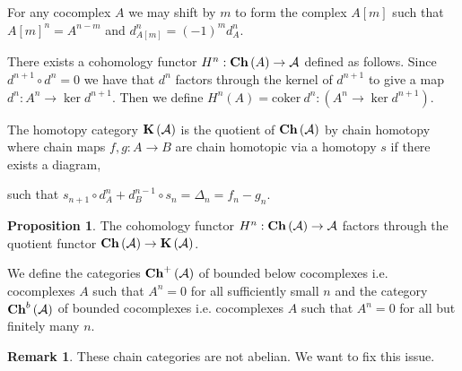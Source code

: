 \documentclass[12pt]{extarticle}
\newcommand{\coker}[1]{\mathrm{coker}\: #1}
\theoremstyle{definition}
\newtheorem{proposition}[theorem]{Proposition}
\newtheorem{remark}{Remark}
\newenvironment{definition}[1][Definition:]{\begin{trivlist}
\item[\hskip \labelsep {\bfseries #1}]}{\end{trivlist}}
\begin{document}
\begin{definition}
For any cocomplex $A$ we may shift by $m$ to form the complex $A[m]$ such that $A[m]^n = A^{n - m}$ and $d_{A[m]}^n = (-1)^m d_A^n$. 
\end{definition}

\begin{definition}
There exists a cohomology functor $H^n : \mathbf{Ch}\left( A \right) \to \mathcal{A}$ defined as follows. Since $d^{n+1} \circ d^n = 0$ we have that $d^{n}$ factors through the kernel of $d^{n+1}$ to give a map $d^{n} : A^n \to \ker{d^{n+1}}$. Then we define $H^n(A) = \coker{d^n : (A^n \to \ker{d^{n+1}})}$. 
\end{definition}

\begin{definition}
The homotopy category $\mathbf{K}\left( \mathcal{A} \right)$ is the quotient of $\mathbf{Ch}\left( \mathcal{A} \right)$ by chain homotopy where chain maps $f, g : A \to B$ are chain homotopic via a homotopy $s$ if there exists a diagram,
\begin{center}
\end{center}
such that $s_{n+1} \circ d_A^n + d_B^{n-1} \circ s_n = \Delta_n = f_n - g_n$.
\end{definition}

\begin{proposition}
The cohomology functor $H^n : \mathbf{Ch}\left( \mathcal{A} \right) \to \mathcal{A}$ factors through the quotient functor $\mathbf{Ch}\left( \mathcal{A} \right) \to \mathbf{K}\left( \mathcal{A} \right)$. 
\end{proposition}

\begin{definition}
We define the categories $\mathbf{Ch}^+\left( \mathcal{A} \right)$ of bounded below cocomplexes i.e. cocomplexes $A$ such that $A^n = 0$ for all sufficiently small $n$ and the category $\mathbf{Ch}^b\left( \mathcal{A} \right)$ of bounded cocomplexes i.e. cocomplexes $A$ such that $A^n = 0$ for all but finitely many $n$. 
\end{definition}

\begin{remark}
These chain categories are not abelian. We want to fix this issue.
\end{remark}
\end{document}
